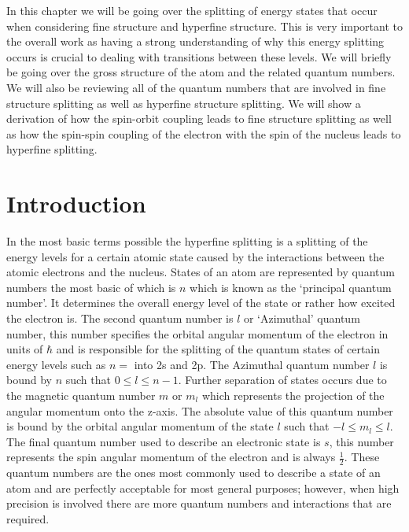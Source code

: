In this chapter we will be going over the splitting of energy states that occur when considering fine structure and hyperfine structure. This is very important to the overall work as having a strong understanding of why this energy splitting occurs is crucial to dealing with transitions between these levels. We will briefly be going over the gross structure of the atom and the related quantum numbers. We will also be reviewing all of the quantum numbers that are involved in fine structure splitting as well as hyperfine structure splitting. We will show a derivation of how the spin-orbit coupling leads to fine structure splitting as well as how the spin-spin coupling of the electron with the spin of the nucleus leads to hyperfine splitting.









\section{Introduction}
In the most basic terms possible the hyperfine splitting is a splitting of the energy levels for a certain atomic state caused by the interactions between the atomic electrons and the nucleus. States of an atom are represented by quantum numbers the most basic of which is $n$ which is known as the ‘principal quantum number’. It determines the overall energy level of the state or rather how excited the electron is. The second quantum number is $l$ or ‘Azimuthal' quantum number, this number specifies the orbital angular momentum of the electron in units of $\hbar$ and is responsible for the splitting of the quantum states of certain energy levels such as $n=$ into 2s and 2p. The Azimuthal quantum number $l$ is bound by $n$ such that $0 \leq l \leq n-1$. Further separation of states occurs due to the magnetic quantum number $m$ or $m_l$ which represents the projection of the angular momentum onto the z-axis. The absolute value of this quantum number is bound by the orbital angular momentum of the state $l$ such that $-l \leq m_l \leq l $. The final quantum number used to describe an electronic state is $s$, this number represents the spin angular momentum of the electron and is always \(\frac{1}{2}\). These quantum numbers are the ones most commonly used to describe a state of an atom and are perfectly acceptable for most general purposes; however, when high precision is involved there are more quantum numbers and interactions that are required.

